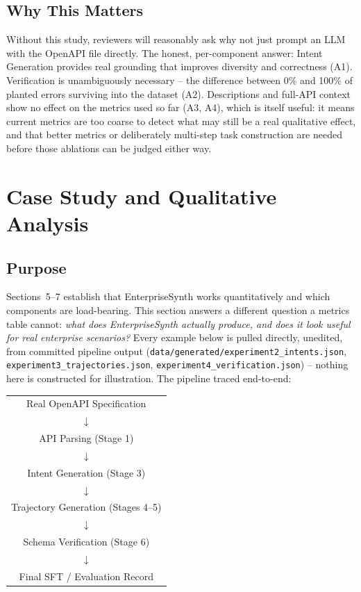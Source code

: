 \documentclass[11pt]{article}
\begin{document}
\subsection{Why This Matters}
Without this study, reviewers will reasonably ask why not just prompt an LLM with the OpenAPI file
directly. The honest, per-component answer: Intent Generation provides real grounding that
improves diversity and correctness (A1). Verification is unambiguously necessary -- the difference
between 0\% and 100\% of planted errors surviving into the dataset (A2). Descriptions and full-API
context show no effect on the metrics used so far (A3, A4), which is itself useful: it means
current metrics are too coarse to detect what may still be a real qualitative effect, and that
better metrics or deliberately multi-step task construction are needed before those ablations can
be judged either way.

\section{Case Study and Qualitative Analysis}

\subsection{Purpose}
Sections~5--7 establish that EnterpriseSynth works quantitatively and which components are
load-bearing. This section answers a different question a metrics table cannot: \textit{what does
EnterpriseSynth actually produce, and does it look useful for real enterprise scenarios?} Every
example below is pulled directly, unedited, from committed pipeline output
(\texttt{data/generated/experiment2\_intents.json}, \texttt{experiment3\_trajectories.json},
\texttt{experiment4\_verification.json}) -- nothing here is constructed for illustration. The
pipeline traced end-to-end:
\begin{center}
\small
\begin{tabular}{c}
Real OpenAPI Specification \\
$\downarrow$ \\
API Parsing (Stage 1) \\
$\downarrow$ \\
Intent Generation (Stage 3) \\
$\downarrow$ \\
Trajectory Generation (Stages 4--5) \\
$\downarrow$ \\
Schema Verification (Stage 6) \\
$\downarrow$ \\
Final SFT / Evaluation Record
\end{tabular}
\end{center}
\end{document}
